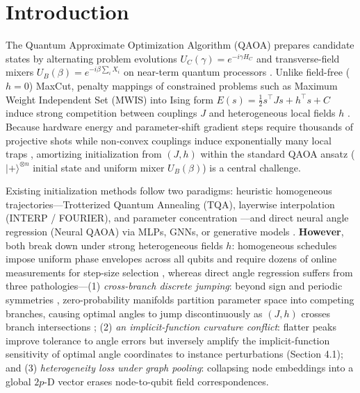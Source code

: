 \documentclass{article}
\theoremstyle{plain}
\theoremstyle{definition}
\begin{document}
\section{Introduction}\label{sec:1}

The Quantum Approximate Optimization Algorithm (QAOA) prepares candidate states by alternating problem evolutions $U_C(\gamma)=e^{-i\gamma H_C}$ and transverse-field mixers $U_B(\beta)=e^{-i\beta\sum_i X_i}$ on near-term quantum processors \citep{blekos2024review,cerezo2021variational,farhi2014quantum,preskill2018quantum}. Unlike field-free ($h=0$) MaxCut, penalty mappings of constrained problems such as Maximum Weight Independent Set (MWIS) into Ising form $E(s)=\frac12s^\top Js+h^\top s+C$ induce strong competition between couplings $J$ and heterogeneous local fields $h$ \citep{ebadi2022quantum,hadfield2019quantum,lucas2014ising,pichler2018quantum}. Because hardware energy and parameter-shift gradient steps require thousands of projective shots \citep{harrigan2021quantum,mitarai2018quantum,pagano2020quantum,wierichs2022general} while non-convex couplings induce exponentially many local traps \citep{anschuetz2022quantum,bittel2021training,mcclean2018barren,shaydulin2019multistart,you2021exponentially}, amortizing initialization from $(J,h)$ within the standard QAOA ansatz ($|+\rangle^{\otimes n}$ initial state and uniform mixer $U_B(\beta)$) is a central challenge.

Existing initialization methods follow two paradigms: heuristic homogeneous trajectories---Trotterized Quantum Annealing (TQA), layerwise interpolation (INTERP / FOURIER), and parameter concentration \citep{brandao2018fixed,crooks2018performance,farhi2001quantum,galda2021transferability,kadowaki1998quantum,sack2021quantum,shaydulin2023parameter,zhou2020quantum}---and direct neural angle regression (Neural QAOA) via MLPs, GNNs, or generative models \citep{amos2023tutorial,amosy2024iteration,jain2022graph,jiang2025qseer,liang2024invited,meng2025conditional}. \textbf{However}, both break down under strong heterogeneous fields $h$: homogeneous schedules impose uniform phase envelopes across all qubits and require dozens of online measurements for step-size selection \citep{katial2025instance}, whereas direct angle regression suffers from three pathologies---(1) \emph{cross-branch discrete jumping}: beyond sign and periodic symmetries \citep{lotshaw2021empirical,shaydulin2021classical}, zero-probability manifolds partition parameter space into competing branches, causing optimal angles to jump discontinuously as $(J,h)$ crosses branch intersections \citep{gould2021deep,rupprecht2017learning,zhang2019deep}; (2) \emph{an implicit-function curvature conflict}: flatter peaks improve tolerance to angle errors but inversely amplify the implicit-function sensitivity of optimal angle coordinates to instance perturbations (Section 4.1); and (3) \emph{heterogeneity loss under graph pooling}: collapsing node embeddings into a global $2p$-D vector erases node-to-qubit field correspondences.
\end{document}
